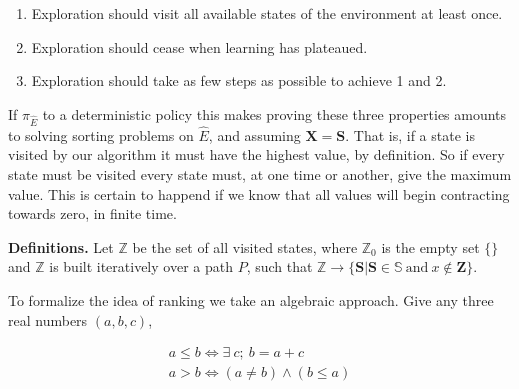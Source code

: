 \begin{enumerate}
	\item Exploration should visit all available states of the environment at least once.
	\item Exploration should cease when learning has plateaued.
	\item Exploration should take as few steps as possible to achieve 1 and 2.
\end{enumerate}

If $\pi_{\hat E}$ to a deterministic policy this makes proving these three properties amounts to solving sorting problems on $\hat E$, and assuming $\mathbf{X} = \mathbf{S}$. That is, if a state is visited by our algorithm it must have the highest value, by definition. So if every state must be visited every state must, at one time or another, give the maximum value. This is certain to happend if we know that all values will begin contracting towards zero, in finite time. 

\textbf{Definitions.} Let $\mathbb{Z}$ be the set of all visited states, where $\mathbb{Z}_0$ is the empty set $\{\}$ and $\mathbb{Z}$ is built iteratively over a path $P$, such that $\mathbb{Z} \rightarrow \{\mathbf{S} | \mathbf{S} \in \mathbb{S}\ \text{and}\ x \not\in \mathbf{Z}\}$. 

To formalize the idea of ranking we take an algebraic approach. Give any three real numbers $(a,b,c)$,

\begin{align}\label{eq:ineq} 
	a \leq b \Leftrightarrow \exists \ c;\ b = a + c \\
	a > b \Leftrightarrow (a \neq b) \wedge (b \leq a) 
\end{align}

